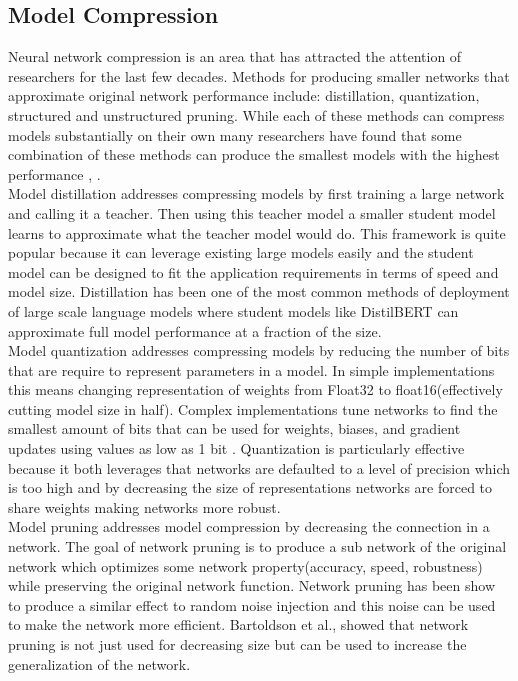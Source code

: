 \subsection{Model Compression}
Neural network compression is an area that has attracted the attention of researchers for the last few decades. Methods for producing smaller networks that approximate original network performance include: distillation, quantization, structured and unstructured pruning. While each of these methods can compress models substantially on their own many researchers have found that some combination of these methods can produce the smallest models with the highest performance \cite{Polino2018ModelCV}, \cite{Sanh2020MovementPA}. \\
Model distillation \cite{Ba2014DoDN} addresses compressing models by first training a large network and calling it a teacher. Then using this teacher model a smaller student model learns to approximate what the teacher model would do. This framework is quite popular because it can leverage existing large models easily and the student model can be designed to fit the application requirements in terms of speed and model size. Distillation has been one of the most common methods of deployment of large scale language models where student models like DistilBERT \cite{Sanh2019DistilBERTAD} can approximate full model performance at a fraction of the size. \\
Model quantization \cite{Gong2014CompressingDC} \cite{Han2016DeepCC} addresses compressing models by reducing the number of bits that are require to represent parameters in a model. In simple implementations this means changing representation of weights from Float32 to float16(effectively cutting model size in half). Complex implementations tune networks to find the smallest amount of bits that can be used for weights, biases, and gradient updates using values as low as 1 bit \cite{Courbariaux2016BinarizedNN}. Quantization is particularly effective because it both leverages that networks are defaulted to a level of precision which is too high and by decreasing the size of representations networks are forced to share weights making networks more robust. \\
Model pruning \cite{LeCun1989OptimalBD} addresses model compression by decreasing the connection in a network. The goal of network pruning is to produce a sub network of the original network which optimizes some network property(accuracy, speed, robustness) while preserving the original network function. Network pruning has been show to produce a similar effect to random noise injection \cite{Bartoldson2019TheGT} and this noise can be used to make the network more efficient. Bartoldson et al., showed that network pruning is not just used for decreasing size but can be used to increase the generalization of the network. 
